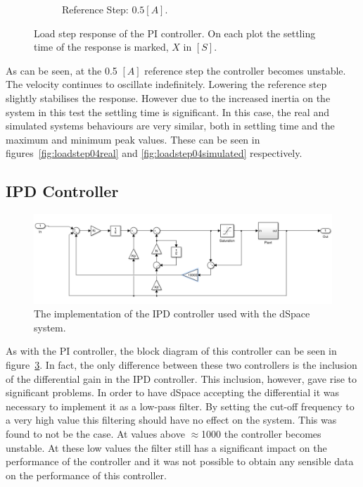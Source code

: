 \begin{figure}
\begin{subfigure}[t]{.49\linewidth}
		\caption{Reference Step: $0.5 [A]$.}
		\label{fig:}
	\end{subfigure}
	\caption[Load step response of PI controller]{Load step response of the PI controller. On each plot the settling time of the response is marked, $X$ in $[S]$.}
	\label{fig:loadstep}
\end{figure}

As can be seen, at the 0.5 $[A]$ reference step the controller becomes unstable.
The velocity continues to oscillate indefinitely.
Lowering the reference step slightly stabilises the response.
However due to the increased inertia on the system in this test the settling time is significant.
In this case, the real and simulated systems behaviours are very similar, both in settling time and the maximum and minimum peak values.
These can be seen in figures~\ref{fig:loadstep04real} and \ref{fig:loadstep04simulated} respectively.

\subsection{IPD Controller}
\begin{figure}[!h]
	\centering
	\includegraphics[width=.75\linewidth]{graphics/ipd_controller}
	\caption{The implementation of the IPD controller used with the dSpace system.}
	\label{fig:ipdcontroller}
\end{figure}

As with the PI controller, the block diagram of this controller can be seen in figure~\ref{fig:ipdcontroller}.
In fact, the only difference between these two controllers is the inclusion of the differential gain in the IPD controller.
This inclusion, however, gave rise to significant problems.
In order to have dSpace accepting the differential it was necessary to implement it as a low-pass filter.
By setting the cut-off frequency to a very high value this filtering should have no effect on the system.
This was found to not be the case. 
At values above $\approx$1000 the controller becomes unstable.
At these low values the filter still has a significant impact on the performance of the controller and it was not possible to obtain any sensible data on the performance of this controller.

